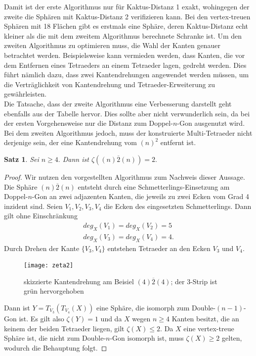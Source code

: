\documentclass[12pt,titlepage,twoside,cleardoublepage]{article}
\theoremstyle{nummermitklammern}
\newtheorem{satz}[temp]{Satz}
\newtheorem{satz}[zahl]{Satz}
\numberwithin{equation}{section}
\begin{document}
Damit ist der erste Algorithmus nur für Kaktus-Distanz 1 exakt, wohingegen der zweite die Sphären mit Kaktus-Distanz 2 verifizieren kann. Bei den vertex-treuen Sphären mit 18 Flächen gibt es erstmals eine Sphäre, deren Kaktus-Distanz echt kleiner als die mit dem zweitem Algorithmus berechnete Schranke ist.
Um den zweiten Algorithmus zu optimieren muss, die Wahl der Kanten genauer betrachtet werden. Beispielsweise kann vermieden werden, dass Kanten, die vor dem Entfernen eines Tetraeders an einem Tetraeder lagen, gedreht werden. Dies führt nämlich dazu, dass zwei Kantendrehungen angewendet werden müssen, um die Verträglichkeit von Kantendrehung und Tetraeder-Erweiterung zu gewährleisten.\\
Die Tatsache, dass der zweite Algorithmus eine Verbesserung darstellt geht ebenfalls aus der Tabelle hervor. Dies sollte aber nicht verwunderlich sein, da bei der ersten Vorgehensweise nur die Distanz zum Doppel-$n$-Gon  ausgenutzt wird. Bei dem zweiten Algorithmus jedoch, muss der konstruierte Multi-Tetraeder nicht derjenige sein, der eine Kantendrehung vom $(n)^2$ entfernt ist.
\begin{satz}
Sei $n \geq 4.$ Dann ist $\zeta((n)\overline{2}(n))=2.$
\end{satz}
\begin{proof}
Wir nutzen den vorgestellten Algorithmus zum Nachweis dieser Aussage.
Die Sphäre $(n)\overline{2}(n)$ entsteht durch eine Schmetterlings-Einsetzung am Doppel-$n$-Gon an zwei adjazenten Kanten, die jeweils zu zwei Ecken vom Grad 4 inzident sind. Seien $V_1,V_2,V_3,V_4$ die Ecken des eingesetzten Schmetterlings. Dann gilt ohne Einschränkung 
\begin{align*}
deg_X(V_1)=deg_X(V_2)=5\\
deg_X(V_3)=deg_X(V_4)=4.
\end{align*}
Durch Drehen der Kante $\{V_3,V_4\}$ entstehen Tetraeder an den Ecken $V_3$ und $V_4.$ 
  
\begin{figure}[H]
\begin{center}
\texttt{[image: zeta2]}
\end{center}
\caption{skizzierte Kantendrehung am Beisiel $(4)\overline{2}(4)$; der 3-Strip ist grün hervorgehoben}
\end{figure}
Dann ist $Y=T_{V_3}(T_{V_4}(X))$ eine Sphäre, die isomorph zum Double-$(n-1)$-Gon ist. Es gilt also $\zeta (Y)=1$ und da $X$ wegen $n\geq 4$ Kanten besitzt, die an keinem der beiden Tetraeder liegen, gilt $\zeta (X)\leq 2.$ Da $X$ eine vertex-treue Sphäre ist, die nicht zum Double-$n$-Gon isomorph ist, muss $\zeta(X)\geq 2$ gelten, wodurch die Behauptung folgt. 
\end{proof}
\end{document}

